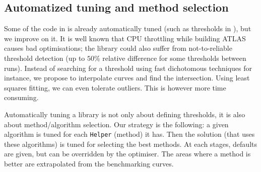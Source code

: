 \subsection{Automatized tuning and method selection}
%
Some of the code in \linbox is already automatically tuned (such as thresholds
in \fgemm), but we improve on it. It is well known that CPU throttling while
building ATLAS causes bad optimisations; the \fflasffpack library could also
suffer from not-to-reliable threshold detection (up to $50\%$ relative
difference for some thresholds between runs). Instead of searching for a
threshold using fast dichotomous techniques for instance, we propose to
interpolate curves and find the intersection. Using least squares fitting, we
can even tolerate outliers. This is however more time consuming.
%
\par
%
Automatically tuning a library is not only about defining thresholds, it is
also about method/algorithm selection. Our strategy is the following: a given
algorithm is tuned for each {\tt Helper} (method) it has.  Then the solution
(that uses these algorithms) is tuned for selecting the best methods.  At each
stages, defaults are given, but can be overridden by the optimiser. The areas
where a method is better are extrapolated from the benchmarking curves.
